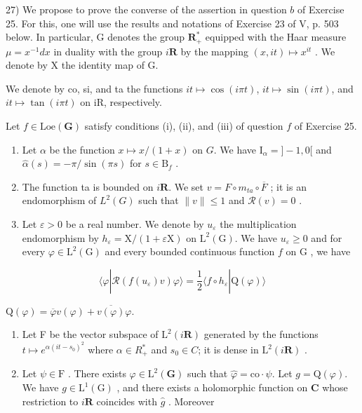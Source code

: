 27) We propose to prove the converse of the assertion in question \(b\) of Exercise 25. For this, one will use the results and notations of Exercise 23 of V, p. 503 below. In particular, G denotes the group \(\mathbf{R}_{+}^{*}\) equipped with the Haar measure \(\mu = x^{-1}dx\) in duality with the group \(i\mathbf{R}\) by the mapping \((x, it) \mapsto x^{it}\) . We denote by X the identity map of G.

We denote by co, si, and ta the functions \(it \mapsto \cos(i\pi t)\), \(it \mapsto \sin(i\pi t)\), and \(it \mapsto \tan(i\pi t)\) on iR, respectively.

Let \(f \in \text{Loe}(\mathbf{G})\) satisfy conditions (i), (ii), and (iii) of question \(f\) of Exercise 25.

\begin{enumerate}
\def\labelenumi{\alph{enumi})}
\item
  Let \(\alpha\) be the function \(x \mapsto x / (1 + x)\) on \(G\). We have \(\mathrm{I}_{\alpha} = ] - 1,0[\) and \(\widehat{\alpha}(s) = -\pi / \sin(\pi s)\) for \(s \in \mathrm{B}_f\) .
\item
  The function ta is bounded on \(i\mathbf{R}\). We set \(v = F \circ m_{ta} \circ \overline{F}\) ; it is an endomorphism of \(L^{2}(G)\) such that \(\|v\| \leqslant 1\) and \(\mathcal{R}(v) = 0\) .
\item
  Let \(\varepsilon > 0\) be a real number. We denote by \(u_{\varepsilon}\) the multiplication endomorphism by \(h_{\varepsilon} = \mathrm{X}/(1 + \varepsilon\mathrm{X})\) on \(\mathrm{L}^2(\mathrm{G})\). We have \(u_{\varepsilon} \geqslant 0\) and for every \(\varphi \in \mathrm{L}^2(\mathrm{G})\) and every bounded continuous function \(f\) on \(\mathrm{G}\) , we have
\end{enumerate}

\[
\langle \varphi | \mathcal {R} (f (u _ {\varepsilon}) v) \varphi \rangle = \frac {1}{2} \langle f \circ h _ {\varepsilon} | \mathrm{Q} (\varphi) \rangle
\]

\(\mathrm{Q}(\varphi) = \overline{\varphi} v(\varphi) + \overline{v(\varphi)}\varphi .\)

\begin{enumerate}
\def\labelenumi{\alph{enumi})}
\setcounter{enumi}{3}
\item
  Let F be the vector subspace of \(\mathrm{L}^{2}(i\mathbf{R})\) generated by the functions \(t \mapsto e^{\alpha(it - s_{0})^{2}}\) where \(\alpha \in R_{+}^{*}\) and \(s_{0} \in C\); it is dense in \(\mathrm{L}^{2}(i\mathbf{R})\) .
\item
  Let \(\psi \in \mathrm{F}\) . There exists \(\varphi \in \mathrm{L}^2 (\mathbf{G})\) such that \(\widehat{\varphi} = \mathrm{co}\cdot \psi\). Let \(g = \mathrm{Q}(\varphi)\). We have \(g\in \mathrm{L}^{1}(\mathrm{G})\) , and there exists a holomorphic function on \(\mathbf{C}\) whose restriction to \(i\mathbf{R}\) coincides with \(\widehat{g}\) . Moreover
\end{enumerate}

